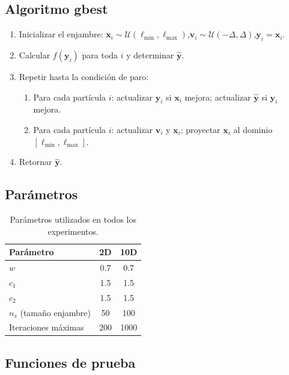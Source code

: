 \documentclass[11pt]{article}
\begin{document}
\subsection{Algoritmo gbest}

\begin{enumerate}
    \item Inicializar el enjambre: $\mathbf{x}_i \sim \mathcal{U}(\ell_{\min},\ell_{\max})$,\quad $\mathbf{v}_i \sim \mathcal{U}(-\Delta,\Delta)$,\quad $\mathbf{y}_i = \mathbf{x}_i$.
    \item Calcular $f(\mathbf{y}_i)$ para toda $i$ y determinar $\hat{\mathbf{y}}$.
    \item Repetir hasta la condici\'on de paro:
    \begin{enumerate}
        \item Para cada part\'icula $i$: actualizar $\mathbf{y}_i$ si $\mathbf{x}_i$ mejora; actualizar $\hat{\mathbf{y}}$ si $\mathbf{y}_i$ mejora.
        \item Para cada part\'icula $i$: actualizar $\mathbf{v}_i$ y $\mathbf{x}_i$; proyectar $\mathbf{x}_i$ al dominio $[\ell_{\min},\ell_{\max}]$.
    \end{enumerate}
    \item Retornar $\hat{\mathbf{y}}$.
\end{enumerate}

\subsection{Par\'ametros}

\begin{table}[H]
\centering
\begin{tabular}{lcc}
\hline\hline
Par\'ametro & 2D & 10D \\
\hline
$w$                       & 0.7  & 0.7  \\
$c_1$                     & 1.5  & 1.5  \\
$c_2$                     & 1.5  & 1.5  \\
$n_s$ (tama\~no enjambre) & 50   & 100  \\
Iteraciones m\'aximas     & 200  & 1000 \\
\hline\hline
\end{tabular}
\caption{Par\'ametros utilizados en todos los experimentos.}
\end{table}

\subsection{Funciones de prueba}
\end{document}

